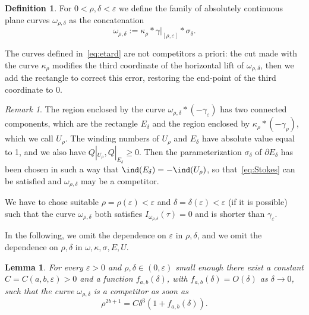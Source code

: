 \documentclass[12pt]{amsart}
\theoremstyle{plain}
\newtheorem {lemma}[theorem]{Lemma}
\theoremstyle{definition}
\newtheorem{definition}[theorem]{Definition}
\theoremstyle{remark}
\newtheorem{remark}[theorem]{Remark}
\numberwithin{equation}{section}
\newcommand{\<}{\langle}
\renewcommand{\>}{\rangle}
\newcommand{\e}{\varepsilon}
\newcommand{\s}{\sigma}
\newcommand{\0}{\theta}
\newcommand{\w}{\omega}
\renewcommand{\d}{\partial}
\renewcommand{\k}{\kappa}
\newcommand{\g}{\gamma}
\newcommand{\de}{\delta}
\newcommand{\1}{{-1}}
\renewcommand{\=}{\coloneqq}
\renewcommand{\.}{\dots}
\renewcommand{\-}{\cdot}
\renewcommand{\:}{\,:\,}
\renewcommand{\k}{\mathrm k}
\renewcommand{\k}{\kappa}
\theoremstyle{definition}
\begin{document}
\begin{figure}[ht]
\end{figure}







\begin{definition}
For $0<\rho,\de<\e$ we define the family of absolutely continuous plane curves $\w_{\rho,\de}$ as the concatenation
\begin{equation}
	\label{eq:etard}
	\w_{\rho,\de}:=\k_\rho * \g|_{[\rho,\e]} * \s_\de.
\end{equation}
\end{definition}

The curves defined in~\eqref{eq:etard} are not competitors a priori: the cut made with the curve $\k_\rho$ modifies the third coordinate of the horizontal lift of $\w_{\rho,\de}$, then we add the rectangle to correct this error, restoring the end-point of the third coordinate to 0. 

\begin{remark}
	\label{rem:win_num}
	The region enclosed by the curve $\w_{\rho,\de}*(-\g_\e)$ has two connected components, which are the rectangle $E_\de$ and the region enclosed by $\k_\rho * (-\g_\rho)$, which we call $U_{\rho}$. The winding numbers of $U_\rho$ and $E_\de$ have absolute value equal to 1, and we also have $Q|_{U_\rho}, Q|_{E_\de}\geq0$. Then the parameterization $\s_\de$ of $\d E_\de$ has been chosen in such a way that $\ind(E_\de)=-\ind(U_\rho)$, so that~\eqref{eq:Stokes} can be satisfied and $\w_{\rho,\de}$ may be a competitor.
\end{remark}

We have to chose suitable $\rho=\rho(\e)<\e$ and $\de=\de(\e)<\e$ (if it is possible) such that the curve $\w_{\rho,\de}$ both satisfies $I_{\w_{\rho,\de}}(\tau)=0$ and is shorter than $\g_\e$.

In the following, we omit the dependence on $\e$ in $\rho,\de$, and we omit the dependence on $\rho,\de$ in $\w,\k,\s, E, U$. 


\begin{lemma}
	\label{lem:correction}
	For every $\e>0$ and $\rho,\de\in(0,\e)$ small enough there exist a constant $C=C(a,b,\e)>0$ and a function $f_{a,b}(\de)$, with $f_{a,b}(\de)=O(\de)$ as $\de\to0$, such that the curve $\w_{\rho,\de}$ is a competitor as soon as
	\begin{equation}
		\label{eq:correction}
		\rho^{2b+1}=C\de^3(1+f_{a,b}(\de)).
	\end{equation}
\end{lemma}
\end{document}
